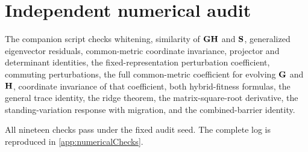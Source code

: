 \section{Independent numerical audit}

The companion script checks whitening, similarity of \(\mathbf{G}\mathbf{H}\) and \(\mathbf{S}\), generalized eigenvector residuals, common-metric coordinate invariance, projector and determinant identities, the fixed-representation perturbation coefficient, commuting perturbations, the full common-metric coefficient for evolving \(\mathbf{G}\) and \(\mathbf{H}\), coordinate invariance of that coefficient, both hybrid-fitness formulas, the general trace identity, the ridge theorem, the matrix-square-root derivative, the standing-variation response with migration, and the combined-barrier identity.

All nineteen checks pass under the fixed audit seed. The complete log is reproduced in \cref{app:numericalChecks}.
